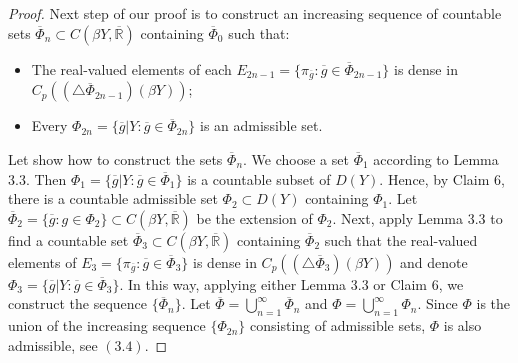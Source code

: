 \documentclass[10pt,a4paper]{amsart}
\begin{document}
\begin{proof}
Next step of our proof is to construct an increasing sequence of countable sets $\overline\Phi_n\subset C(\beta Y,\overline{\mathbb R})$ containing $\overline\Phi_0$ such that:
\begin{itemize}
\item The real-valued elements of each $E_{2n-1}=\{\pi_{\overline g}: \overline g\in\overline\Phi_{2n-1}\}$ is dense in
$C_p((\triangle\overline\Phi_{2n-1})(\beta Y))$;
\item Every $\Phi_{2n}=\{\overline g|Y:\overline g\in\overline\Phi_{2n}\}$ is an admissible set.
\end{itemize}
Let show how to construct the sets $\overline\Phi_{n}$. We choose a set $\overline\Phi_{1}$ according to Lemma 3.3. Then 
$\Phi_{1}=\{\overline g|Y:\overline g\in\overline\Phi_{1}\}$ is a countable subset of $D(Y)$. Hence, by Claim 6, there is a countable admissible set
$\Phi_2\subset D(Y)$ containing $\Phi_{1}$. Let $\overline\Phi_2=\{\overline g:g\in\Phi_2\}\subset C(\beta Y,\overline{\mathbb R})$ be the extension of $\Phi_2$. Next, apply Lemma 3.3 to find a countable set $\overline\Phi_3\subset C(\beta Y,\overline{\mathbb R})$ containing $\overline\Phi_2$ such that
the real-valued elements of $E_{3}=\{\pi_{\overline g}: \overline g\in\overline\Phi_{3}\}$ is dense in
$C_p((\triangle\overline\Phi_{3})(\beta Y))$ and denote $\Phi_3=\{\overline g|Y:\overline g\in\overline\Phi_{3}\}$. In this way, applying either Lemma 3.3 or Claim 6, we construct the sequence $\{\overline\Phi_n\}$. Let $\overline\Phi=\bigcup_{n=1}^\infty\overline\Phi_n$ and $\Phi=\bigcup_{n=1}^\infty\Phi_n$. Since $\Phi$ is the union of the increasing sequence $\{\Phi_{2n}\}$ consisting of admissible sets, $\Phi$ is also admissible, see $(3.4)$. 


\end{proof}
\end{document}

